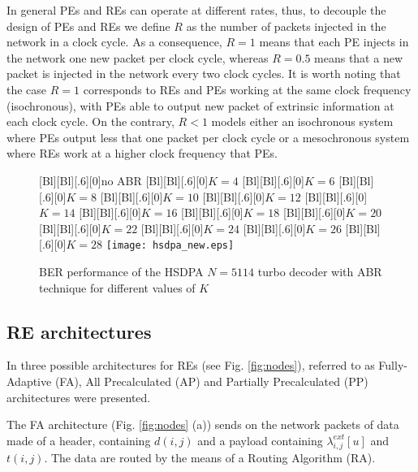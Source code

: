 \documentclass[10pt,twocolumn,journal]{IEEEtran}
\begin{document}
In general PEs and REs can operate at different rates, thus, 
to decouple the design of PEs and REs we define $R$ as the number of packets injected in the network in a clock cycle. 
As a consequence, $R=1$ means that each PE injects in the network one new packet per clock cycle, whereas 
$R=0.5$ means that a new packet is injected in the network every two clock cycles. It is worth noting that 
the case $R=1$ corresponds to REs and PEs working at the same clock frequency (isochronous), 
with PEs able to output new packet of extrinsic information at each clock cycle. 
On the contrary, $R<1$ models either an isochronous system where PEs output less that one packet per clock cycle 
or a mesochronous system where REs work at a higher clock frequency that PEs. 
\begin{figure}[t!]
  \centering
  [Bl][Bl][.6][0]{no ABR}
  [Bl][Bl][.6][0]{$K=4$}
  [Bl][Bl][.6][0]{$K=6$}
  [Bl][Bl][.6][0]{$K=8$}
  [Bl][Bl][.6][0]{$K=10$}
  [Bl][Bl][.6][0]{$K=12$}
  [Bl][Bl][.6][0]{$K=14$}
  [Bl][Bl][.6][0]{$K=16$}
  [Bl][Bl][.6][0]{$K=18$}
  [Bl][Bl][.6][0]{$K=20$}
  [Bl][Bl][.6][0]{$K=22$}
  [Bl][Bl][.6][0]{$K=24$}
  [Bl][Bl][.6][0]{$K=26$}
  [Bl][Bl][.6][0]{$K=28$}
  \texttt{[image: hsdpa\_new.eps]}
\caption{BER performance of the HSDPA $N=5114$ turbo decoder with ABR technique for different values of $K$} 
\label{fig:hsdpa}
\end{figure}

\subsection{RE architectures}
\label{subsec:REarch}

In \cite{martina_TCASI10} three possible architectures for REs (see 
Fig. \ref{fig:nodes}), referred to as 
Fully-Adaptive (FA), All Precalculated (AP) and Partially Precalculated (PP) architectures were presented. 

The FA architecture (Fig. \ref{fig:nodes} (a)) sends on the network packets of data made of a header, containing $d(i,j)$
and a payload containing $\lambda^{ext}_{i,j}[u]$ and $t(i,j)$. The data are routed by the means of 
a Routing Algorithm (RA).
\end{document}
